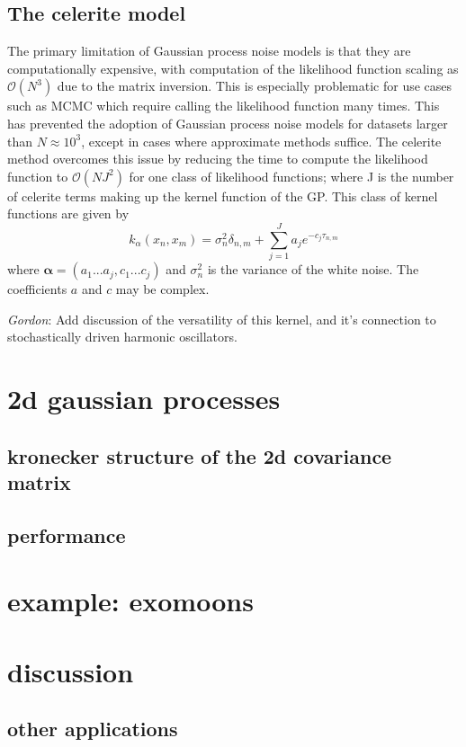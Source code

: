 \documentclass[modern]{aastex62}
\newcommand{\todo}[3]{{\color{#2}\emph{#1}: #3}}
\newcommand{\gordontodo}[1]{\todo{Gordon}{red}{#1}}
\newcommand{\project}[1]{\textsf{#1}}
\newcommand{\celerite}{\project{celerite }}
\newcommand{\bvec}[1]{{\ensuremath{\boldsymbol{#1}}}}
\begin{document}
	\subsection{The \celerite model}
		The primary limitation of Gaussian process noise models is that they are computationally expensive, with computation of the likelihood function scaling as 
		$\mathcal{O}(N^3)$ due to the matrix inversion. This is especially problematic for use cases such as MCMC which require calling the likelihood function many 
		times. This has prevented the adoption of Gaussian process noise models for datasets larger than $N \approx 10^3$, except in cases where approximate 
		methods suffice. The \celerite method overcomes this issue by reducing the time to compute the likelihood function to $\mathcal{O}(NJ^2)$ for one 
		class of likelihood functions; where J is the number of \celerite terms making up the kernel function of the GP. This class of kernel functions are given by 
		\begin{equation}
			k_\alpha(x_n, x_m) = \sigma_n^2 \delta_{n, m} + \sum_{j=1}^J a_j e^{-c_j\tau_{n, m}}
		\end{equation}
		where $\bvec{\alpha} = (a_1...a_j, c_1...c_j)$ and $\sigma_n^2$ is the variance of the white noise. The coefficients $a$ and $c$ may be complex.
		 
		\gordontodo{Add discussion of the versatility of this kernel, and it's connection to stochastically driven harmonic oscillators.}
		

\section{2d gaussian processes}
	\subsection{kronecker structure of the 2d covariance matrix}
	\subsection{performance}
	
\section{example: exomoons}

\section{discussion}
	\subsection{other applications}
\end{document}
